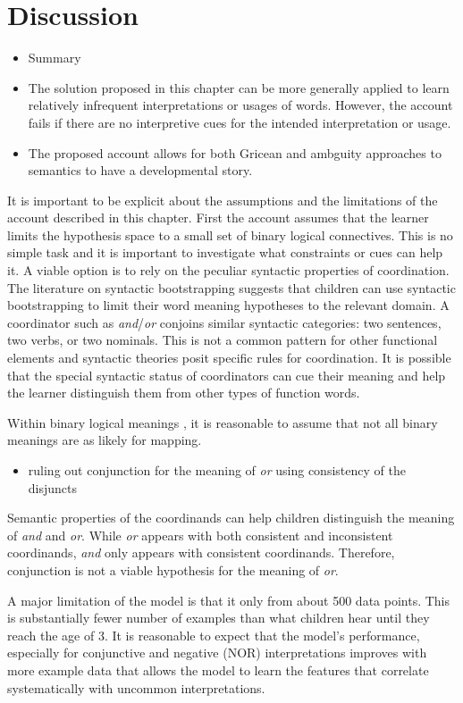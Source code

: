 \documentclass[oneside]{report}
\theoremstyle{definition}
\theoremstyle{definition}
\theoremstyle{definition}
\theoremstyle{remark}
\begin{document}
\section{Discussion}\label{discussion-5}
\begin{itemize}
\item
  Summary
\item
  The solution proposed in this chapter can be more generally applied to
  learn relatively infrequent interpretations or usages of words.
  However, the account fails if there are no interpretive cues for the
  intended interpretation or usage.
\item
  The proposed account allows for both Gricean and ambguity approaches
  to semantics to have a developmental story.
\end{itemize}
It is important to be explicit about the assumptions and the limitations
of the account described in this chapter. First the account assumes that
the learner limits the hypothesis space to a small set of binary logical
connectives. This is no simple task and it is important to investigate
what constraints or cues can help it. A viable option is to rely on the
peculiar syntactic properties of coordination. The literature on
syntactic bootstrapping suggests that children can use syntactic
bootstrapping to limit their word meaning hypotheses to the relevant
domain. A coordinator such as \emph{and}/\emph{or} conjoins similar
syntactic categories: two sentences, two verbs, or two nominals. This is
not a common pattern for other functional elements and syntactic
theories posit specific rules for coordination. It is possible that the
special syntactic status of coordinators can cue their meaning and help
the learner distinguish them from other types of function words.

Within binary logical meanings , it is reasonable to assume that not all
binary meanings are as likely for mapping.
\begin{itemize}
\tightlist
\item
  ruling out conjunction for the meaning of \emph{or} using consistency
  of the disjuncts
\end{itemize}
Semantic properties of the coordinands can help children distinguish the
meaning of \emph{and} and \emph{or}. While \emph{or} appears with both
consistent and inconsistent coordinands, \emph{and} only appears with
consistent coordinands. Therefore, conjunction is not a viable
hypothesis for the meaning of \emph{or}.

A major limitation of the model is that it only from about 500 data
points. This is substantially fewer number of examples than what
children hear until they reach the age of 3. It is reasonable to expect
that the model's performance, especially for conjunctive and negative
(NOR) interpretations improves with more example data that allows the
model to learn the features that correlate systematically with uncommon
interpretations.
\end{document}

